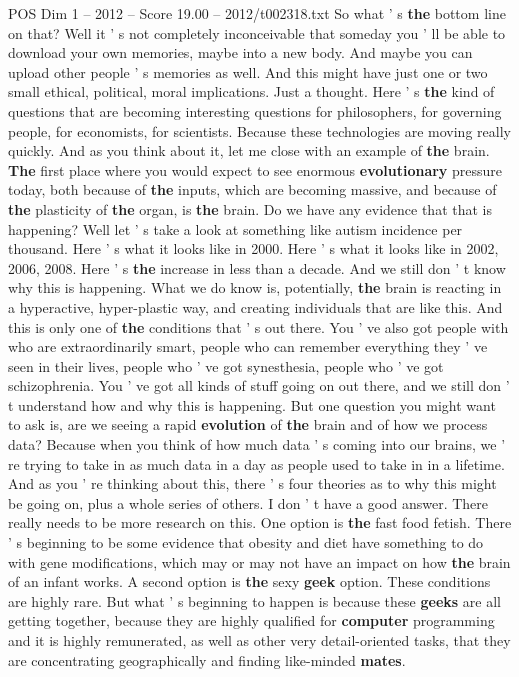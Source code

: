 \begin{textsample}{POS Dim 1 – 2012 – Score 19.00 – 2012/t002318.txt}
So what ' s \textbf{the} bottom line on that?
Well it ' s not completely inconceivable that someday you ' ll be able to download your own memories, maybe into a new body.
And maybe you can upload other people ' s memories as well.
And this might have just one or two small ethical, political, moral implications.
Just a thought.
Here ' s \textbf{the} kind of questions that are becoming interesting questions for philosophers, for governing people, for economists, for scientists.
Because these technologies are moving really quickly.
And as you think about it, let me close with an example of \textbf{the} brain. \textbf{The} first place where you would expect to see enormous \textbf{evolutionary} pressure today, both because of \textbf{the} inputs, which are becoming massive, and because of \textbf{the} plasticity of \textbf{the} organ, is \textbf{the} brain.
Do we have any evidence that that is happening?
Well let ' s take a look at something like autism incidence per thousand.
Here ' s what it looks like in 2000.
Here ' s what it looks like in 2002, 2006, 2008.
Here ' s \textbf{the} increase in less than a decade.
And we still don ' t know why this is happening.
What we do know is, potentially, \textbf{the} brain is reacting in a hyperactive, hyper-plastic way, and creating individuals that are like this.
And this is only one of \textbf{the} conditions that ' s out there.
You ' ve also got people with who are extraordinarily smart, people who can remember everything they ' ve seen in their lives, people who ' ve got synesthesia, people who ' ve got schizophrenia.
You ' ve got all kinds of stuff going on out there, and we still don ' t understand how and why this is happening.
But one question you might want to ask is, are we seeing a rapid \textbf{evolution} of \textbf{the} brain and of how we process data?
Because when you think of how much data ' s coming into our brains, we ' re trying to take in as much data in a day as people used to take in in a lifetime.
And as you ' re thinking about this, there ' s four theories as to why this might be going on, plus a whole series of others.
I don ' t have a good answer.
There really needs to be more research on this.
One option is \textbf{the} fast food fetish.
There ' s beginning to be some evidence that obesity and diet have something to do with gene modifications, which may or may not have an impact on how \textbf{the} brain of an infant works.
A second option is \textbf{the} sexy \textbf{geek} option.
These conditions are highly rare.
But what ' s beginning to happen is because these \textbf{geeks} are all getting together, because they are highly qualified for \textbf{computer} programming and it is highly remunerated, as well as other very detail-oriented tasks, that they are concentrating geographically and finding like-minded \textbf{mates}.

\end{textsample}
